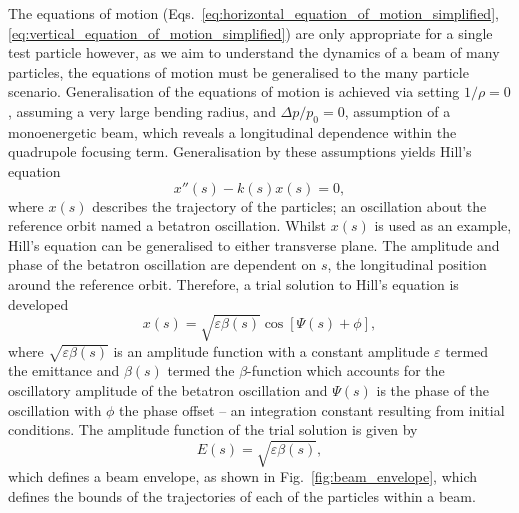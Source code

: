 \documentclass[../main.tex]{subfiles}
\begin{document}
The equations of motion (Eqs.~\ref{eq:horizontal_equation_of_motion_simplified}, \ref{eq:vertical_equation_of_motion_simplified}) are only appropriate for a single test particle however, as we aim to understand the dynamics of a beam of many particles, the equations of motion must be generalised to the many particle scenario. Generalisation of the equations of motion is achieved via setting $1/\rho=0$, assuming a very large bending radius, and $\Delta p/p_{0}=0$, assumption of a monoenergetic beam, which reveals a longitudinal dependence within the quadrupole focusing term. Generalisation by these assumptions yields Hill's equation
\begin{equation}
x''\left(s\right)-k\left(s\right)x\left(s\right) = 0,
\label{eq:Hills_equation}    
\end{equation}
where $x\left(s\right)$ describes the trajectory of the particles; an oscillation about the reference orbit named a betatron oscillation. Whilst $x\left(s\right)$ is used as an example, Hill's equation can be generalised to either transverse plane. The amplitude and phase of the betatron oscillation are dependent on $s$, the longitudinal position around the reference orbit. Therefore, a trial solution to Hill's equation is developed 
\begin{equation}
x\left(s\right) = \sqrt{\varepsilon\beta\left(s\right)}\cos\left[\Psi\left(s\right)+\phi\right],
\label{eq:Hills_trial_solution}    
\end{equation}
where $\sqrt{\varepsilon\beta\left(s\right)}$ is an amplitude function with a constant amplitude $\varepsilon$ termed the emittance and $\beta\left(s\right)$ termed the $\beta$-function which accounts for the oscillatory amplitude of the betatron oscillation and $\Psi\left(s\right)$ is the phase of the oscillation with $\phi$ the phase offset -- an integration constant resulting from initial conditions. The amplitude function of the trial solution is given by
\begin{equation}
E\left(s\right) = \sqrt{\varepsilon\beta\left(s\right)},
\label{eq:envelope_function}    
\end{equation}
which defines a beam envelope, as shown in Fig.~\ref{fig:beam_envelope}, which defines the bounds of the trajectories of each of the particles within a beam. 
\end{document}
